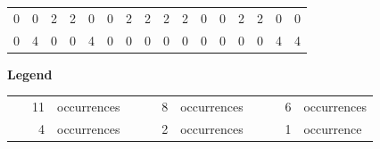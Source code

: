 \begin{table}
\begin{tabular}{|*{8}{w{c}{0.03\textwidth}w{c}{0.03\textwidth}|}}
        \hline
        
        0 & 0 & 2 & 2 &
        0 & 0 & 2 & 2 &
        2 & 2 &
        \textcolor{Gelo}0 & \textcolor{Gelo}0 &
        2 & 2 &
        0 & 0 \\
         
        0 & 4 & 0 & 0 &
        4 & 0 & 0 & 0 &
        0 & 0 &
        \textcolor{Gelo}0 & \textcolor{Gelo}0 &
        0 & 0 &
        4 & 4 \\
        
        \hline
    
    \end{tabular}

    \vspace{0.25em}

    \begin{center}
    \footnotesize
    \textbf{Legend} \par

    \begin{tabular}{*{3}{w{c}{0.03\textwidth}rl}}
         \\

          & \ 11 & occurrences \ &
         \phantom{XX} & \ 8 & occurrences \ &
         \phantom{XX} & \ 6 & occurrences \\
         \phantom{XX} & \ 4 & occurrences \ &
         \phantom{XX} & \ 2 & occurrences \ &
         \phantom{XX} & \ 1 & occurrence \\
    \end{tabular}
    \end{center}
\end{table}
